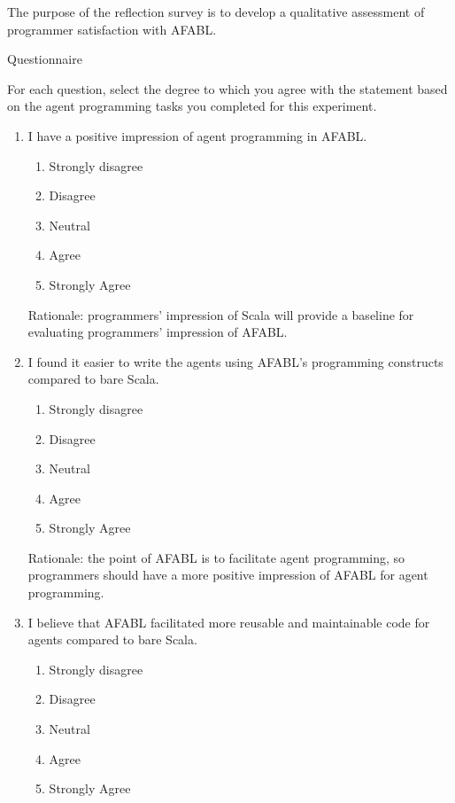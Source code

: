 \begin{appendices}
The purpose of the reflection survey is to develop a qualitative assessment of programmer satisfaction with AFABL.

Questionnaire

For each question, select the degree to which you agree with the statement based on
the agent programming tasks you completed for this experiment.

\begin{enumerate}
\item I have a positive impression of agent programming in AFABL.

\begin{enumerate}
\item Strongly disagree
\item Disagree
\item Neutral
\item Agree
\item Strongly Agree
\end{enumerate}

Rationale: programmers’ impression of Scala will provide a baseline for evaluating
programmers’ impression of AFABL.

\item I found it easier to write the agents using AFABL’s programming constructs compared to bare Scala.

\begin{enumerate}
\item Strongly disagree
\item Disagree
\item Neutral
\item Agree
\item Strongly Agree
\end{enumerate}

Rationale: the point of AFABL is to facilitate agent programming, so programmers should have a more positive impression of AFABL for agent programming.

\item I believe that AFABL facilitated more reusable and maintainable code for agents compared to bare Scala.

\begin{enumerate}
\item Strongly disagree
\item Disagree
\item Neutral
\item Agree
\item Strongly Agree
\end{enumerate}


\end{enumerate}
\end{appendices}
